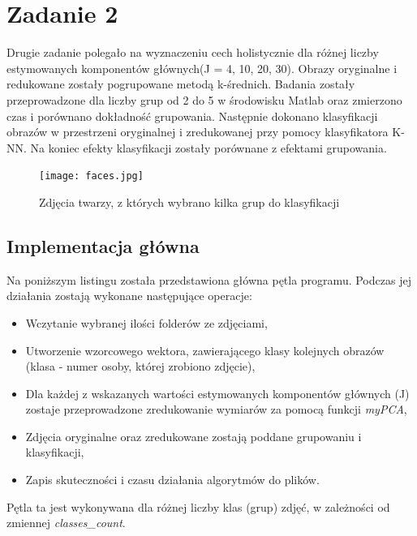 \section{Zadanie 2}

Drugie zadanie polegało na wyznaczeniu cech holistycznie dla różnej liczby estymowanych komponentów głównych(J = 4, 10, 20, 30). Obrazy oryginalne i redukowane zostały pogrupowane metodą k-średnich. Badania zostały przeprowadzone dla liczby grup od 2 do 5 w środowisku Matlab oraz zmierzono czas i porównano dokładność grupowania. Następnie dokonano klasyfikacji obrazów w przestrzeni oryginalnej i zredukowanej przy pomocy klasyfikatora K-NN. Na koniec efekty klasyfikacji zostały porównane z efektami grupowania.



\begin{figure}[H]
	\centering
	\hspace*{-1.2in}
	\texttt{[image: faces.jpg]}
	\caption{Zdjęcia twarzy, z których wybrano kilka grup do klasyfikacji}  
	\label{rys:faces} 
\end{figure}

\subsection{Implementacja główna}

Na poniższym listingu została przedstawiona główna pętla programu. Podczas jej działania zostają wykonane następujące operacje:
\begin{itemize}
	\item Wczytanie wybranej ilości folderów ze zdjęciami,
	\item Utworzenie wzorcowego wektora, zawierającego klasy kolejnych obrazów (klasa - numer osoby, której zrobiono zdjęcie), 
	\item Dla każdej z wskazanych wartości estymowanych komponentów głównych (J) zostaje przeprowadzone zredukowanie wymiarów za pomocą funkcji \textit{myPCA},
	\item Zdjęcia oryginalne oraz zredukowane zostają poddane grupowaniu i klasyfikacji,
	\item Zapis skuteczności i czasu działania algorytmów do plików.
\end{itemize}

Pętla ta jest wykonywana dla różnej liczby klas (grup) zdjęć, w zależności od zmiennej \textit{classes\_count}.

\vspace{5mm}

